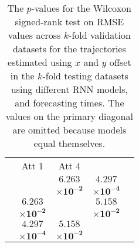 \begin{table}[!ht]
{\begin{tabular}{|c|c|c|c|c|c|c|c|c|}
			 \multicolumn{4}{c}{} & Att 1 & Att 4 & & \multicolumn{2}{c}{} \\ \cline{5-7}
			 \multicolumn{4}{c}{} & \multirow{2}{*}{} & $\mathbf{6.263}$ & $\mathbf{4.297}$ & \multicolumn{2}{c}{} \\ 
			 \multicolumn{4}{c}{} & & $\mathbf{\times 10^{-2}}$ & $\mathbf{\times 10^{-4}}$ & \multicolumn{2}{c}{} \\ \cline{5-7}
			 \multicolumn{4}{c}{} & $\mathbf{6.263}$ & \multirow{2}{*}{} & $\mathbf{5.158}$ & \multicolumn{2}{c}{} \\ 
			 \multicolumn{4}{c}{} & $\mathbf{\times 10^{-2}}$ & & $\mathbf{\times 10^{-2}}$ & \multicolumn{2}{c}{} \\ \cline{5-7}
			 \multicolumn{4}{c}{} & $\mathbf{4.297}$ & $\mathbf{5.158}$ & \multirow{2}{*}{} & \multicolumn{2}{c}{} \\ 
			 \multicolumn{4}{c}{} & $\mathbf{\times 10^{-4}}$ & $\mathbf{\times 10^{-2}}$ & & \multicolumn{2}{c}{} \\ \cline{2-7} \cline{9-9}
		\end{tabular}
	}
	\caption{The $p$-values for the Wilcoxon signed-rank test on RMSE values across $k$-fold validation datasets for the trajectories estimated using $x$ and $y$ offset in the $k$-fold testing datasets using different RNN models, and forecasting times. The values on the primary diagonal are omitted because models equal themselves.}
	\label{tab:var_no abs_RMSE}
\end{table}